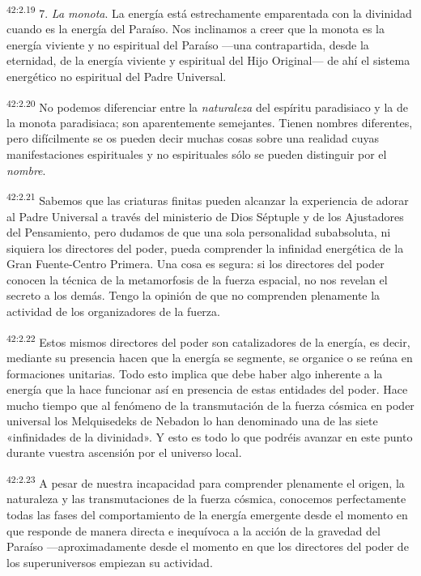 \par
\textsuperscript{42:2.19} 7. \textit{La monota}. La energía está estrechamente emparentada con la divinidad cuando es la energía del Paraíso. Nos inclinamos a creer que la monota es la energía viviente y no espiritual del Paraíso ---una contrapartida, desde la eternidad, de la energía viviente y espiritual del Hijo Original--- de ahí el sistema energético no espiritual del Padre Universal.

\par
\textsuperscript{42:2.20} No podemos diferenciar entre la \textit{naturaleza} del espíritu paradisiaco y la de la monota paradisiaca; son aparentemente semejantes. Tienen nombres diferentes, pero difícilmente se os pueden decir muchas cosas sobre una realidad cuyas manifestaciones espirituales y no espirituales sólo se pueden distinguir por el \textit{nombre}.

\par
\textsuperscript{42:2.21} Sabemos que las criaturas finitas pueden alcanzar la experiencia de adorar al Padre Universal a través del ministerio de Dios Séptuple y de los Ajustadores del Pensamiento, pero dudamos de que una sola personalidad subabsoluta, ni siquiera los directores del poder, pueda comprender la infinidad energética de la Gran Fuente-Centro Primera. Una cosa es segura: si los directores del poder conocen la técnica de la metamorfosis de la fuerza espacial, no nos revelan el secreto a los demás. Tengo la opinión de que no comprenden plenamente la actividad de los organizadores de la fuerza.

\par
\textsuperscript{42:2.22} Estos mismos directores del poder son catalizadores de la energía, es decir, mediante su presencia hacen que la energía se segmente, se organice o se reúna en formaciones unitarias. Todo esto implica que debe haber algo inherente a la energía que la hace funcionar así en presencia de estas entidades del poder. Hace mucho tiempo que al fenómeno de la transmutación de la fuerza cósmica en poder universal los Melquisedeks de Nebadon lo han denominado una de las siete «infinidades de la divinidad». Y esto es todo lo que podréis avanzar en este punto durante vuestra ascensión por el universo local.

\par
\textsuperscript{42:2.23} A pesar de nuestra incapacidad para comprender plenamente el origen, la naturaleza y las transmutaciones de la fuerza cósmica, conocemos perfectamente todas las fases del comportamiento de la energía emergente desde el momento en que responde de manera directa e inequívoca a la acción de la gravedad del Paraíso ---aproximadamente desde el momento en que los directores del poder de los superuniversos empiezan su actividad.

